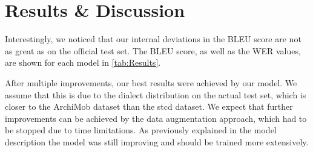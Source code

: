 \section{Results \& Discussion}
Interestingly, we noticed that our internal deviations in the BLEU score are not as great as on the official test set. The BLEU score, as well as the WER values, are shown for each model in
\cref{tab:Results}.

After multiple improvements, our best results were achieved by our  model. We assume that this is due to the dialect distribution on the actual test set, which is closer to the ArchiMob dataset
than the \gls{stcd} dataset. We expect that further improvements can be achieved by the data augmentation approach, which had to be stopped due to time limitations. As previously explained in the
model description the  model was still improving and should be trained more extensively.
